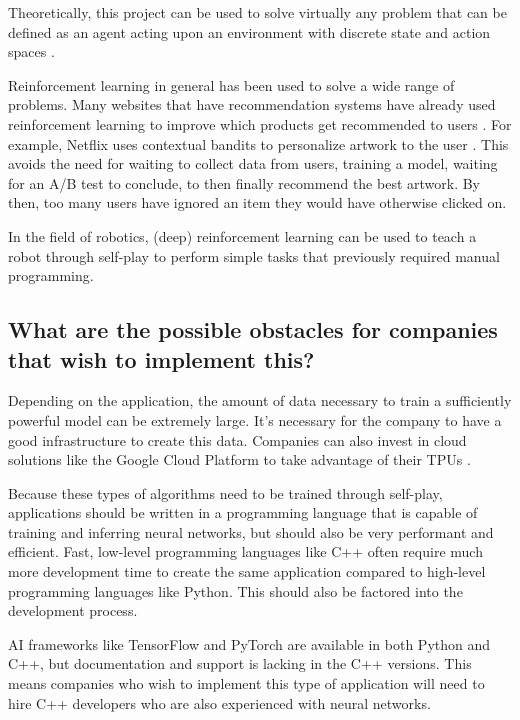 \documentclass{article}
\begin{document}
Theoretically, this project can be used to solve virtually any problem that can be
defined as an agent acting upon an environment with discrete state and action spaces \cite{ReinforcementLearning2022a}.

Reinforcement learning in general has been used to solve a wide range of problems.
Many websites that have recommendation systems have already used reinforcement learning 
to improve which products get recommended to users \cite{nbroAnswerAreThere2020}. 
For example, Netflix uses contextual bandits to personalize artwork to the user \cite{blogArtworkPersonalizationNetflix2017,surmenokContextualBanditsReinforcement2017}.
This avoids the need for waiting to collect data from users, training a model,
waiting for an A/B test to conclude, to then finally recommend the best artwork.
By then, too many users have ignored an item they would have otherwise clicked on.



In the field of robotics, (deep) reinforcement learning can be used to teach a robot
through self-play to perform simple tasks that previously required manual programming.

\subsection{What are the possible obstacles for companies that wish to implement this?}

Depending on the application, the amount of data necessary to train a sufficiently powerful model
can be extremely large. It's necessary for the company to have a good infrastructure to 
create this data. Companies can also invest in cloud solutions like the Google Cloud Platform
to take advantage of their TPUs \cite{CloudComputingServices}.

Because these types of algorithms need to be trained through self-play, applications should be written
in a programming language that is capable of training and inferring neural networks, 
but should also be very performant and efficient. 
Fast, low-level programming languages like C++ often require much more development time
to create the same application compared to high-level programming languages like Python. 
This should also be factored into the development process.

AI frameworks like TensorFlow and PyTorch are available in both Python and C++, 
but documentation and support is lacking in the C++ versions. This means companies 
who wish to implement this type of application will need to hire C++ developers who
are also experienced with neural networks.
\end{document}
